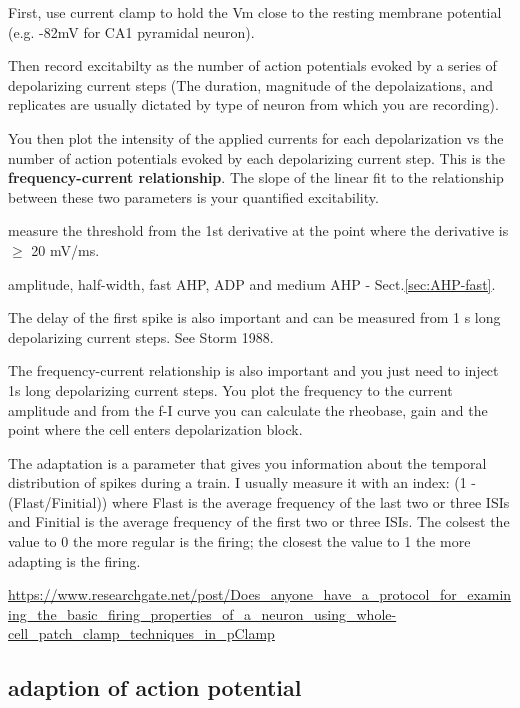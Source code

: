 \begin{mdframed}
  First, use current clamp to hold the Vm close to the resting membrane
  potential (e.g. -82mV for CA1 pyramidal neuron).
  
Then record excitabilty as the number of action potentials evoked by a series of
depolarizing current steps (The duration, magnitude of the depolaizations, and
replicates are usually dictated by type of neuron from which you are recording).

You then plot the intensity of the applied currents for each depolarization vs
the number of action potentials evoked by each depolarizing current step. This
is the {\bf frequency-current relationship}. The slope of the linear fit to the
relationship between these two parameters is your quantified excitability.
\end{mdframed}

measure the threshold from the 1st derivative at the point where the derivative
is $\ge$ 20 mV/ms. 

amplitude, half-width, fast AHP, ADP and medium AHP - Sect.\ref{sec:AHP-fast}.

The delay of the first spike is also important and can be measured from 1 s long
depolarizing current steps. See Storm 1988.

The frequency-current relationship is also important and you just need to inject
1s long depolarizing current steps. You plot the frequency to the current
amplitude and from the f-I curve you can calculate the rheobase, gain and the
point where the cell enters depolarization block.

The adaptation is a parameter that gives you information about the temporal
distribution of spikes during a train. I usually measure it with an index: (1  - 
(Flast/Finitial)) where Flast is the average frequency of the last two or three
ISIs and Finitial is the average frequency of the first two or three ISIs. The
colsest the value to 0 the more regular is the firing; the closest the value to
1 the more adapting is the firing.

\url{https://www.researchgate.net/post/Does_anyone_have_a_protocol_for_examining_the_basic_firing_properties_of_a_neuron_using_whole-cell_patch_clamp_techniques_in_pClamp}



\subsection{adaption of action potential}
\label{sec:adaptation-AP}


